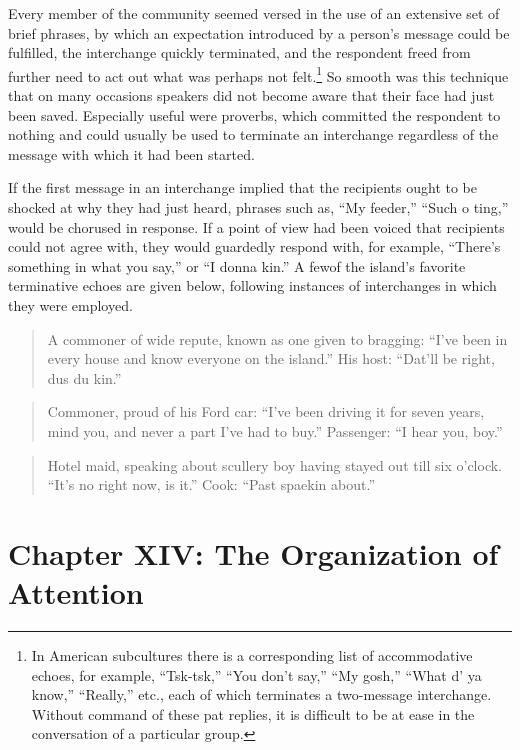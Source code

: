 \documentclass[twoside,symmetric,nobib,justified]{tufte-book}
\let\oldchapter\chapter
\def\chapter{%
  \setcounter{footnote}{0}%
  \oldchapter
}
\begin{document}
Every member of the community seemed versed in the use of an extensive
set of brief phrases, by which an expectation introduced by a person's
message could be fulfilled, the interchange quickly terminated, and the
respondent freed from further need to act out what was perhaps not
felt.\footnote{In American subcultures there is a corresponding list of
  accommodative echoes, for example, ``Tsk-tsk,'' ``You don't say,''
  ``My gosh,'' ``What d' ya know,'' ``Really,'' etc., each of which
  terminates a two-message interchange. Without command of these pat
  replies, it is difficult to be at ease in the conversation of a
  particular group.} So smooth was this technique that on many occasions
speakers did not become aware that their face had just been saved.
Especially useful were proverbs, which committed the respondent to
nothing and could usually be used to terminate an interchange regardless
of the message with which it had been started.

If the first message in an interchange implied that the recipients ought
to be shocked at why they had just heard, phrases such as, ``My
feeder,'' ``Such o ting,'' would be chorused in response. If a point of
view had been voiced that recipients could not agree with, they would
guardedly respond with, for example, ``There's something in what you
say,'' or ``I donna kin.'' A few\newpage\noindent of the island's favorite terminative
echoes are given below, following instances of interchanges in which
they were employed.

\begin{quote}
A commoner of wide repute, known as one given to bragging: ``I've been
in every house and know everyone on the island.'' His host: ``Dat'll be
right, dus du kin.''
\end{quote}

\begin{quote}
Commoner, proud of his Ford car: ``I've been driving it for seven years,
mind you, and never a part I've had to buy.'' Passenger: ``I hear you,
boy.''
\end{quote}

\begin{quote}
Hotel maid, speaking about scullery boy having stayed out till six
o'clock. ``It's no right now, is it.'' Cook: ``Past spaekin about.''
\end{quote}


    
\chapter[CHAPTER XIV: THE ORGANIZATION OF ATTENTION]{Chapter XIV: The Organization of\\Attention}
\label{ch:Chapter XIV: The Organization of Attention}
\end{document}
